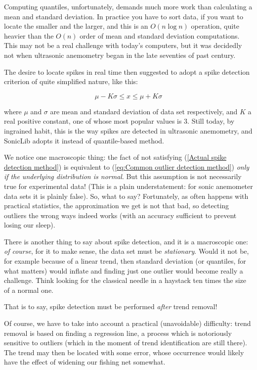 \documentclass[a4paper,10pt]{book}
\begin{document}
Computing quantiles, unfortunately, demands much more work than calculating a mean and standard deviation. In practice you have to sort data, if you want to locate the smaller and the larger, and this is an $O(n \log n)$ operation, quite heavier than the $O(n)$ order of mean and standard deviation computations. This may not be a real challenge with today's computers, but it was decidedly not when ultrasonic anemometry began in the late seventies of past century.

The desire to locate spikes in real time then suggested to adopt a spike detection criterion of quite simplified nature, like this:

\begin{equation}\label{eq:Actual spike detection method}
	\mu - K \sigma \le x \le \mu + K \sigma
\end{equation}

\noindent where $\mu$ and $\sigma$ are mean and standard deviation of data set respectively, and $K$ a real positive constant, one of whose most popular values is 3. Still today, by ingrained habit, this is the way spikes are detected in ultrasonic anemometry, and SonicLib adopts it instead of quantile-based method.

We notice one macroscopic thing: the fact of not satisfying (\ref{Actual spike detection method}) is equivalent to (\ref{eq:Common outlier detection method}) \emph{only if the underlying distribution is normal}. But this assumption is not necessarily true for experimental data! (This is a plain understatement: for sonic anemometer data sets it is plainly false). So, what to say? Fortunately, as often happens with practical statistics, the approximation we get is not that bad, so detecting outliers the wrong ways indeed works (with an accuracy sufficient to prevent losing our sleep).

There is another thing to say about spike detection, and it is a macroscopic one: \emph{of course}, for it to make sense, the data set must be \emph{stationary}. Would it not be, for example because of a linear trend, then standard deviation (or quantiles, for what matters) would inflate and finding just one outlier would become really a challenge. Think looking for the classical needle in a haystack ten times the size of a normal one.

That is to say, spike detection must be performed \emph{after} trend removal!

Of course, we have to take into account a practical (unavoidable) difficulty: trend removal is based on finding a regression line, a process which is notoriously sensitive to outliers (which in the moment of trend identification are still there). The trend may then be located with some error, whose occurrence would likely have the effect of widening our fishing net somewhat.
\end{document}
